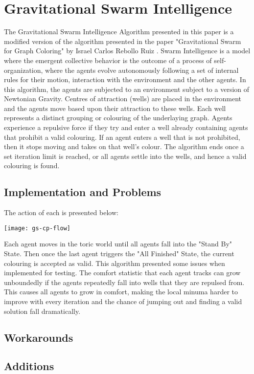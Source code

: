 \section{Gravitational Swarm Intelligence}
The Gravitational Swarm Intelligence Algorithm presented in this paper is a modified version of the algorithm presented in the paper "Gravitational Swarm for Graph Coloring" by Israel Carlos Rebollo Ruiz \cite{bib:GravSwarm}. Swarm Intelligence is a model where the emergent collective behavior is the outcome of a process of self-organization, where the agents evolve autonomously following a set of internal rules for their motion, interaction with the environment and the other agents. In this algorithm, the agents are subjected to an environment subject to a version of Newtonian Gravity. Centres of attraction (wells) are placed in the environment and the agents move based upon their attraction to these wells. Each well represents a distinct grouping or colouring of the underlaying graph. Agents experience a repulsive force if they try and enter a well already containing agents that prohibit a valid colouring. If an agent enters a well that is not prohibited, then it stops moving and takes on that well's colour. The algorithm ends once a set iteration limit is reached, or all agents settle into the wells, and hence a valid colouring is found.

\subsection{Implementation and Problems}
The action of each is presented below:
\begin{center}
\texttt{[image: gs-cp-flow]}
\end{center}
Each agent moves in the toric world until all agents fall into the "Stand By" State. Then once the last agent triggers the "All Finished" State, the current colouring is accepted as valid. This algorithm presented some issues when implemented for testing. The comfort statistic that each agent tracks can grow unboundedly if the agents repeatedly fall into wells that they are repulsed from. This causes all agents to grow in comfort, making the local minuma harder to improve with every iteration and the chance of jumping out and finding a valid solution fall dramatically. 

\subsection{Workarounds}
\subsection{Additions}